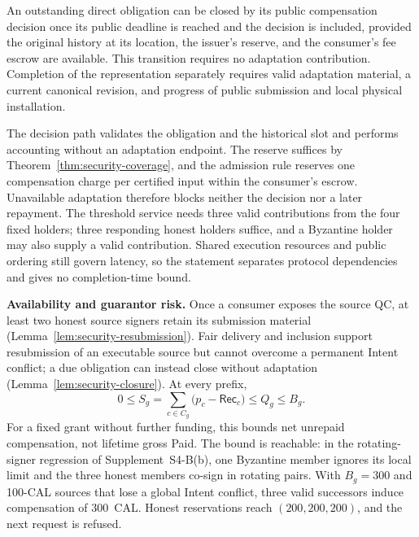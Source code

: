\begin{lemma}
\label{lem:security-closure}
An outstanding direct obligation can be closed by its public
compensation decision once its public deadline is reached and the
decision is included, provided the original history at its location, the
issuer's reserve, and the consumer's fee escrow are available. This
transition requires no adaptation contribution. Completion of the
representation separately requires valid adaptation material, a current
canonical revision, and progress of public submission and local physical
installation.
\end{lemma}
\begin{IEEEproof}
The decision path validates the obligation and the historical slot and performs accounting without an adaptation endpoint. The reserve suffices by Theorem~\ref{thm:security-coverage}, and the admission rule reserves one compensation charge per certified input within the consumer's escrow. Unavailable adaptation therefore blocks neither the decision nor a later repayment. The threshold service needs three valid contributions from the four fixed holders; three responding honest holders suffice, and a Byzantine holder may also supply a valid contribution. Shared execution resources and public ordering still govern latency, so the statement separates protocol dependencies and gives no completion-time bound.
\end{IEEEproof}

\noindent\textbf{Availability and guarantor risk.}
Once a consumer exposes the source QC, at least two honest source
signers retain its submission material
(Lemma~\ref{lem:security-resubmission}). Fair delivery and inclusion
support resubmission of an executable source but cannot overcome a
permanent Intent conflict; a due obligation can instead close without
adaptation (Lemma~\ref{lem:security-closure}). At every prefix,
\[
  0\le S_g=\sum_{c\in C_g}
       \bigl(p_c-\mathsf{Rec}_c\bigr)\le Q_g\le B_g .
\]
For a fixed grant without further funding, this bounds net unrepaid compensation, not lifetime gross Paid. The bound is reachable: in the rotating-signer regression of Supplement~S4-B(b), one Byzantine member ignores its local limit and the three honest members co-sign in rotating pairs. With $B_g=300$ and 100-CAL sources that lose a global Intent conflict, three valid successors induce compensation of 300~CAL. Honest reservations reach $(200,200,200)$, and the next request is refused.

